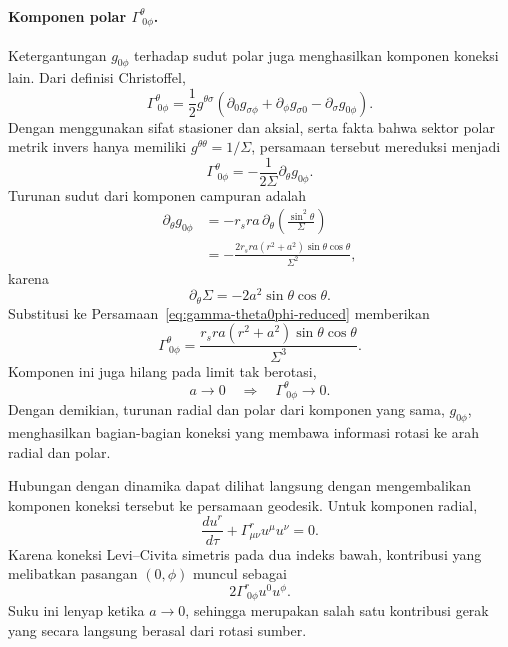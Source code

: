 \paragraph{Komponen polar $\Gamma^\theta_{\ 0\phi}$.}
Ketergantungan $g_{0\phi}$ terhadap sudut polar juga menghasilkan komponen
koneksi lain. Dari definisi Christoffel,
\begin{equation}
    \Gamma^\theta_{\ 0\phi}
    =\frac{1}{2}g^{\theta\sigma}
    \left(
        \partial_0 g_{\sigma\phi}
        +\partial_\phi g_{\sigma0}
        -\partial_\sigma g_{0\phi}
    \right).
\end{equation}
Dengan menggunakan sifat stasioner dan aksial, serta fakta bahwa sektor
polar metrik invers hanya memiliki $g^{\theta\theta}=1/\Sigma$, persamaan
tersebut mereduksi menjadi
\begin{equation}
    \Gamma^\theta_{\ 0\phi}
    =-\frac{1}{2\Sigma}\partial_\theta g_{0\phi}.
    \label{eq:gamma-theta0phi-reduced}
\end{equation}
Turunan sudut dari komponen campuran adalah
\begin{equation}
\begin{split}
    \partial_\theta g_{0\phi}
    &=-r_sra\,\partial_\theta
    \left(\frac{\sin^2\!\theta}{\Sigma}\right)\\
    &=-\frac{2r_sra\left(r^2+a^2\right)
    \sin\theta\cos\theta}{\Sigma^2},
\end{split}
    \label{eq:dg0phi-dtheta}
\end{equation}
karena
\begin{equation}
    \partial_\theta\Sigma
    =-2a^2\sin\theta\cos\theta.
\end{equation}
Substitusi ke Persamaan~\eqref{eq:gamma-theta0phi-reduced} memberikan
\begin{equation}
    \Gamma^\theta_{\ 0\phi}
    =\frac{r_sra\left(r^2+a^2\right)
    \sin\theta\cos\theta}{\Sigma^3}.
    \label{eq:gamma-theta0phi-result}
\end{equation}
Komponen ini juga hilang pada limit tak berotasi,
\begin{equation}
    a\rightarrow0
    \quad\Longrightarrow\quad
    \Gamma^\theta_{\ 0\phi}\rightarrow0.
\end{equation}
Dengan demikian, turunan radial dan polar dari komponen yang sama,
$g_{0\phi}$, menghasilkan bagian-bagian koneksi yang membawa informasi
rotasi ke arah radial dan polar.

Hubungan dengan dinamika dapat dilihat langsung dengan mengembalikan
komponen koneksi tersebut ke persamaan geodesik. Untuk komponen radial,
\begin{equation}
    \frac{du^r}{d\tau}
    +\Gamma^r_{\mu\nu}u^\mu u^\nu=0.
\end{equation}
Karena koneksi Levi--Civita simetris pada dua indeks bawah, kontribusi yang
melibatkan pasangan $(0,\phi)$ muncul sebagai
\begin{equation}
    2\Gamma^r_{\ 0\phi}u^0u^\phi.
    \label{eq:geodesic-rotation-term}
\end{equation}
Suku ini lenyap ketika $a\rightarrow0$, sehingga merupakan salah satu
kontribusi gerak yang secara langsung berasal dari rotasi sumber.

